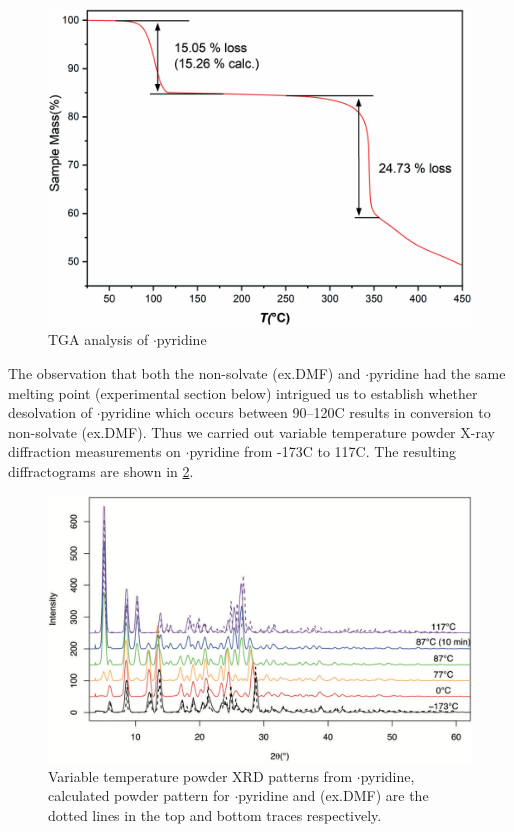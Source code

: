 \begin{refsection}
\begin{figure}
    \centering
    \includegraphics[width=0.8\linewidth]{Figures/tga.pdf}
    \caption{TGA analysis of $\cdot$pyridine}
    \label{fig:tga}
\end{figure}

The observation that both the non-solvate (ex.DMF) and $\cdot$pyridine had the same melting point (experimental section below) intrigued us to establish whether desolvation of $\cdot$pyridine which occurs between 90--120\degree C results in conversion to non-solvate (ex.DMF). 
Thus we carried out variable temperature powder X-ray diffraction measurements on $\cdot$pyridine from -173\degree C to 117\degree C.
The resulting diffractograms are shown in \cref{fig:vt-pdx}.

\begin{figure}
    \centering
    \includegraphics[width=\linewidth]{Figures/vt-pdx.pdf}
    \caption[Variable temperature powder XRD patterns from $\cdot$pyridine]{Variable temperature powder XRD patterns from $\cdot$pyridine, calculated powder pattern for $\cdot$pyridine and (ex.DMF) are the dotted lines in the top and bottom traces respectively.}
    \label{fig:vt-pdx}
\end{figure}


\end{refsection}
